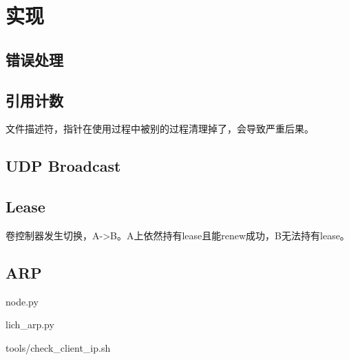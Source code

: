\chapter{实现}

\section{错误处理}

\section{引用计数}

文件描述符，指针在使用过程中被别的过程清理掉了，会导致严重后果。

\section{UDP Broadcast}

\section{Lease}

卷控制器发生切换，A->B。A上依然持有lease且能renew成功，B无法持有lease。

\section{ARP}

node.py

lich\_arp.py

tools/check\_client_ip.sh
